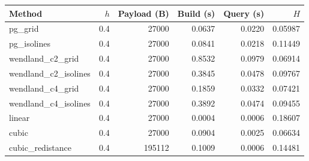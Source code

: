 \begin{tabular}{lrrrrr}\toprule
Method & $h$ & Payload (B) & Build (s) & Query (s) & $H$ \\ \midrule
pg\_grid & 0.4 & 27000 & 0.0637 & 0.0220 & 0.05987 \\
pg\_isolines & 0.4 & 27000 & 0.0841 & 0.0218 & 0.11449 \\
wendland\_c2\_grid & 0.4 & 27000 & 0.8532 & 0.0979 & 0.06914 \\
wendland\_c2\_isolines & 0.4 & 27000 & 0.3845 & 0.0478 & 0.09767 \\
wendland\_c4\_grid & 0.4 & 27000 & 0.1859 & 0.0332 & 0.07421 \\
wendland\_c4\_isolines & 0.4 & 27000 & 0.3892 & 0.0474 & 0.09455 \\
linear & 0.4 & 27000 & 0.0004 & 0.0006 & 0.18607 \\
cubic & 0.4 & 27000 & 0.0904 & 0.0025 & 0.06634 \\
cubic\_redistance & 0.4 & 195112 & 0.1009 & 0.0006 & 0.14481 \\
\bottomrule\end{tabular}
